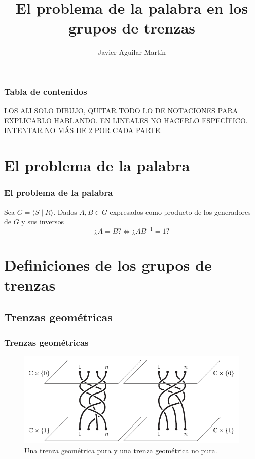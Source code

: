 \documentclass{beamer}
\title{El problema de la palabra en los grupos de trenzas}
\author{Javier Aguilar Martín}
\institute{Universidad de Sevilla}
\date{}
\theoremstyle{definition}
\providecommand{\gene}[1]{\langle{#1}\rangle}
\begin{document}
\frame{\titlepage}
%
%
% 
% 
% 
% 



\begin{frame}
\frametitle{Tabla de contenidos}
\tableofcontents
\end{frame}


\begin{frame}
LOS AIJ SOLO DIBUJO, QUITAR TODO LO DE NOTACIONES PARA EXPLICARLO HABLANDO. 
EN LINEALES NO HACERLO ESPECÍFICO.
INTENTAR NO MÁS DE 2 POR CADA PARTE.


\end{frame}
\section{El problema de la palabra}

\begin{frame}
\frametitle{El problema de la palabra}
Sea $G=\gene{S\mid R}$. Dados $A,B\in G$ expresados como producto de los generadores de $G$ y sus inversos
\[
\mbox{¿}A=B?\Leftrightarrow \mbox{¿}AB^{-1}=1?
\]
\end{frame}

\section{Definiciones de los grupos de trenzas}

\subsection{Trenzas geométricas}

\begin{frame}
\frametitle{Trenzas geométricas}
\begin{figure}[h!]
\includegraphics[scale=0.5]{Imagenes/hilos}
\caption{Una trenza geométrica pura y una trenza geométrica no pura.}
\end{figure}
\end{frame}
\end{document}
